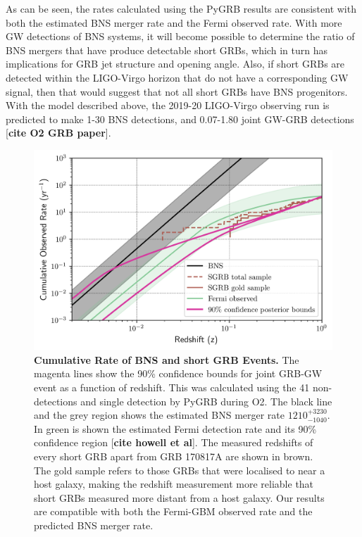 \documentclass[11pt]{cuthesis}
\begin{document}
As can be seen, the rates calculated using the PyGRB results are consistent with both the estimated BNS merger rate and the Fermi observed rate. With more GW detections of BNS systems, it will become possible to determine the ratio of BNS mergers that have produce detectable short GRBs, which in turn has implications for GRB jet structure and opening angle. Also, if short GRBs are detected within the LIGO-Virgo horizon that do not have a corresponding GW signal, then that would suggest that not all short GRBs have BNS progenitors. With the model described above, the 2019-20 LIGO-Virgo observing run is predicted to make 1-30 BNS detections, and 0.07-1.80 joint GW-GRB detections [\textbf{cite O2 GRB paper}].
\begin{figure}
\begin{center}
\includegraphics[width=0.9\linewidth]{cumulative_rate.png}
\end{center}
\caption{\textbf{Cumulative Rate of BNS and short GRB Events.} The magenta lines show the 90\% confidence bounds for joint GRB-GW event as a function of redshift. This was calculated using the 41 non-detections and single detection by PyGRB during O2. The black line and the grey region shows the estimated BNS  merger rate $1210^{+3230}_{-1040}$. In green is shown the estimated Fermi detection rate and its 90\% confidence region [\textbf{cite howell et al}]. The measured redshifts of every short GRB apart from GRB 170817A are shown in brown. The gold sample refers to those GRBs that were localised to near a host galaxy, making the redshift measurement more reliable that short GRBs measured more distant from a host galaxy. Our results are compatible with both the Fermi-GBM observed rate and the predicted BNS merger rate. }
\label{fig:cum rate}
\end{figure}
\end{document}
